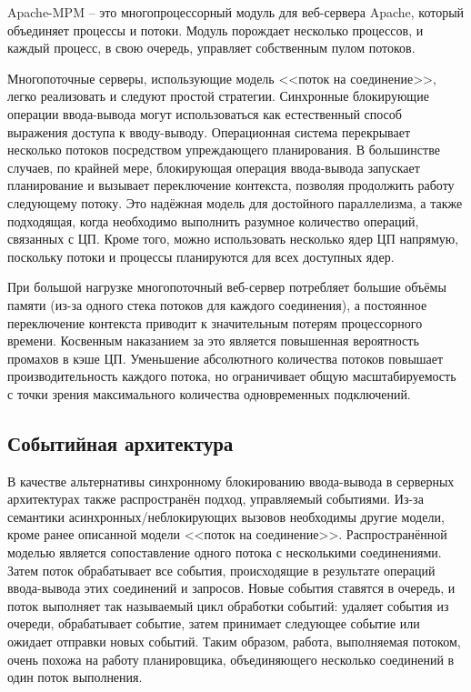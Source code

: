 Apache-MPM -- это многопроцессорный модуль для веб-сервера Apache, который объединяет процессы и потоки. Модуль порождает несколько процессов, и каждый процесс, в свою очередь, управляет собственным пулом потоков.

Многопоточные серверы, использующие модель <<поток на соединение>>, легко реализовать и следуют простой стратегии. Синхронные блокирующие операции ввода-вывода могут использоваться как естественный способ выражения доступа к вводу-выводу. Операционная система перекрывает несколько потоков посредством упреждающего планирования. В большинстве случаев, по крайней мере, блокирующая операция ввода-вывода запускает планирование и вызывает переключение контекста, позволяя продолжить работу следующему потоку. Это надёжная модель для достойного параллелизма, а также подходящая, когда необходимо выполнить разумное количество операций, связанных с ЦП. Кроме того, можно использовать несколько ядер ЦП напрямую, поскольку потоки и процессы планируются для всех доступных ядер.

При большой нагрузке многопоточный веб-сервер потребляет большие объёмы памяти (из-за одного стека потоков для каждого соединения), а постоянное переключение контекста приводит к значительным потерям процессорного времени. Косвенным наказанием за это является повышенная вероятность промахов в кэше ЦП. Уменьшение абсолютного количества потоков повышает производительность каждого потока, но ограничивает общую масштабируемость с точки зрения максимального количества одновременных подключений.

\subsection{Событийная архитектура}

В качестве альтернативы синхронному блокированию ввода-вывода в серверных архитектурах также распространён подход, управляемый событиями. Из-за семантики асинхронных/неблокирующих вызовов необходимы другие модели, кроме ранее описанной модели <<поток на соединение>>. Распространённой моделью является сопоставление одного потока с несколькими соединениями. Затем поток обрабатывает все события, происходящие в результате операций ввода-вывода этих соединений и запросов. Новые события ставятся в очередь, и поток выполняет так называемый цикл обработки событий: удаляет события из очереди, обрабатывает событие, затем принимает следующее событие или ожидает отправки новых событий. Таким образом, работа, выполняемая потоком, очень похожа на работу планировщика, объединяющего несколько соединений в один поток выполнения.

